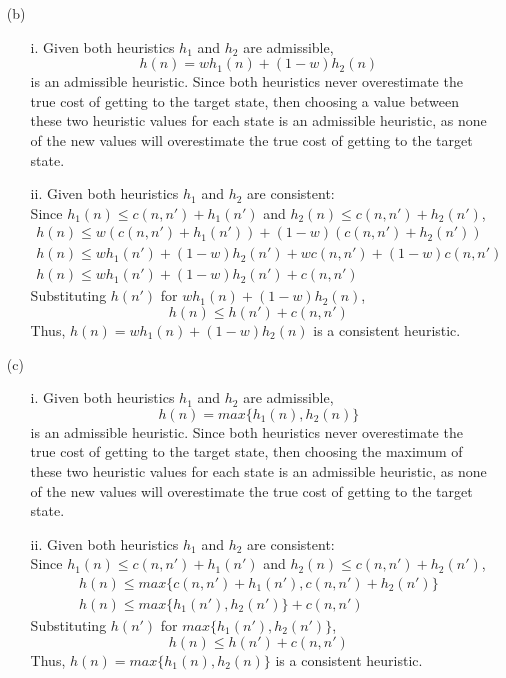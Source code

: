 \documentclass[11pt]{article}
\begin{document}
\begin{enumerate}
        \item[(b)]
            \begin{enumerate}
                \item[i.] Given both heuristics $h_1$ and $h_2$ are admissible,
                \[h(n) = wh_1(n)+(1-w)h_2(n)\] is an admissible heuristic.
                Since both heuristics never overestimate the true cost of getting to the target state, then choosing
                a value between these two heuristic values for each state is an admissible heuristic, as none of the
                new values will overestimate the true cost of getting to the target state.
                \item[ii.] Given both heuristics $h_1$ and $h_2$ are consistent: \\
                Since $h_1(n) \leq c(n, n') + h_1(n')$ and $h_2(n) \leq c(n, n') + h_2(n')$,
                \begin{gather*}
                    h(n) \leq w\left(c(n, n') + h_1(n')\right)+(1-w)\left(c(n, n') + h_2(n')\right)\\
                    h(n) \leq wh_1(n')+(1-w)h_2(n') + wc(n, n') + (1-w)c(n, n')\\
                    h(n) \leq wh_1(n')+(1-w)h_2(n') + c(n, n')
                \end{gather*}
                Substituting $h(n')$ for $wh_1(n)+(1-w)h_2(n)$,
                \[h(n) \leq h(n') + c(n, n')\]
                Thus, $h(n) = wh_1(n)+(1-w)h_2(n)$ is a consistent heuristic.
            \end{enumerate}

        \item[(c)]
            \begin{enumerate}
                \item[i.] Given both heuristics $h_1$ and $h_2$ are admissible,
                \[h(n) = max\{h_1(n), h_2(n)\}\] is an admissible heuristic.
                Since both heuristics never overestimate the true cost of getting to the target state, then choosing the maximum
                of these two heuristic values for each state is an admissible heuristic, as none of the
                new values will overestimate the true cost of getting to the target state.
                \item[ii.] Given both heuristics $h_1$ and $h_2$ are consistent: \\
                Since $h_1(n) \leq c(n, n') + h_1(n')$ and $h_2(n) \leq c(n, n') + h_2(n')$,
                \begin{gather*}
                    h(n) \leq max\{c(n, n') + h_1(n'), c(n, n') + h_2(n')\}\\
                    h(n) \leq max\{h_1(n'), h_2(n')\} + c(n, n')
                \end{gather*}
                Substituting $h(n')$ for $max\{h_1(n'), h_2(n')\}$,
                \[h(n) \leq h(n') + c(n, n')\]
                Thus, $h(n) = max\{h_1(n), h_2(n)\}$ is a consistent heuristic.
            \end{enumerate}
    \end{enumerate}
\end{document}
